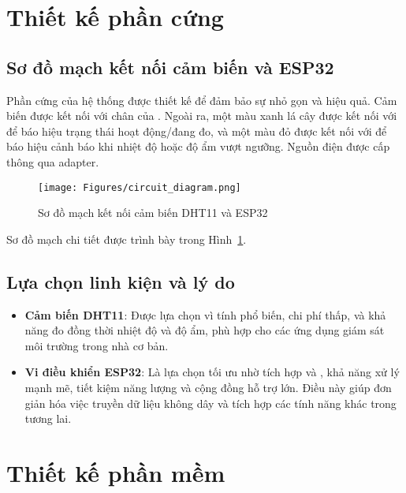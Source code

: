 \section{Thiết kế phần cứng}
\subsection{Sơ đồ mạch kết nối cảm biến và ESP32}
Phần cứng của hệ thống được thiết kế để đảm bảo sự nhỏ gọn và hiệu quả. Cảm biến  được kết nối với chân  của . Ngoài ra, một  màu xanh lá cây được kết nối với  để báo hiệu trạng thái hoạt động/đang đo, và một  màu đỏ được kết nối với  để báo hiệu cảnh báo khi nhiệt độ hoặc độ ẩm vượt ngưỡng. Nguồn điện  được cấp thông qua adapter.

\begin{figure}[hbtp]
	\centering
	\texttt{[image: Figures/circuit\_diagram.png]} %
	\caption{Sơ đồ mạch kết nối cảm biến DHT11 và ESP32}
	\label{fig:circuit}
\end{figure}
Sơ đồ mạch chi tiết được trình bày trong Hình~\ref{fig:circuit}.

\subsection{Lựa chọn linh kiện và lý do}
\begin{itemize}
	\item \textbf{Cảm biến DHT11}: Được lựa chọn vì tính phổ biến, chi phí thấp, và khả năng đo đồng thời nhiệt độ và độ ẩm, phù hợp cho các ứng dụng giám sát môi trường trong nhà cơ bản.
	\item \textbf{Vi điều khiển ESP32}: Là lựa chọn tối ưu nhờ tích hợp  và , khả năng xử lý mạnh mẽ, tiết kiệm năng lượng và cộng đồng hỗ trợ lớn. Điều này giúp đơn giản hóa việc truyền dữ liệu không dây và tích hợp các tính năng khác trong tương lai.
\end{itemize}

\section{Thiết kế phần mềm}
